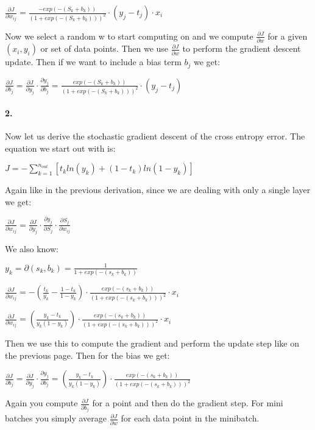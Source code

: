 \documentclass[12pt]{article}
\begin{document}
$\frac{\partial J}{\partial w_{ij}} = 
\frac{-exp(-(S_k + b_k))}{(1 + exp(-(S_k + b_k)))^2}
\cdot (y_j - t_j) \cdot x_i$

Now we select a random w to start computing on and we compute $\frac{\partial J}{\partial w}$ for a given $(x_i, y_i)$ or set of data points. Then we use $\frac{\partial J}{\partial w}$ to perform the gradient descent update. Then if we want to include a bias term $b_j$ we get:

$\frac{\partial J}{\partial b_j} =
\frac{\partial J}{\partial y_j} \cdot \frac{\partial y_j}{\partial b_j}
= \frac{exp(-(S_k + b_k))}{(1 + exp(-(S_k + b_k)))^2}
\cdot (y_j - t_j)
$

\paragraph{2.}

Now let us derive the stochastic gradient descent of the cross entropy error. The equation we start out with is:

$J = - \sum\limits_{k=1}^{n_{out}} [t_k ln(y_k) + (1 - t_k)ln(1-y_k)]$

Again like in the previous derivation, since we are dealing with only a single layer we get:

$\frac{\partial J}{\partial w_{ij}} = 
\frac{\partial J}{\partial y_j} \cdot \frac{\partial y_j}{\partial S_j} \cdot \frac{\partial S_j}{\partial w_{ij}}$

We also know:

$y_k = \partial(s_k,b_k) = \frac{1}{1 + exp(-(s_k + b_k))}$

$\frac{\partial J}{\partial w_{ij}}= -(\frac{t_k}{y_k} - \frac{1 - t_k}{1 - y_k}) \cdot
\frac{exp(-(s_k + b_k))}{(1 + exp(-(s_k + b_k)))^2}
\cdot x_i $

$\frac{\partial J}{\partial w_{ij}}= (\frac{y_k - t_k}{y_k(1 - y_k)}) \cdot
\frac{exp(-(s_k + b_k))}{(1 + exp(-(s_k + b_k)))^2}
\cdot x_i $

Then we use this to compute the gradient and perform the update step like on the previous page. Then for the bias we get:

$\frac{\partial J}{\partial b_j}=
\frac{\partial J}{\partial y_j} \cdot \frac{\partial y_j}{\partial b_j}
= (\frac{y_k - t_k}{y_k(1 - y_k)}) \cdot
\frac{exp(-(s_k + b_k))}{(1 + exp(-(s_k + b_k)))^2}
$

Again you compute $\frac{\partial J}{\partial b_j}$ for a point and then do the gradient step. For mini batches you simply average $\frac{\partial J}{\partial w}$ for each data point in the minibatch.
\end{document}
